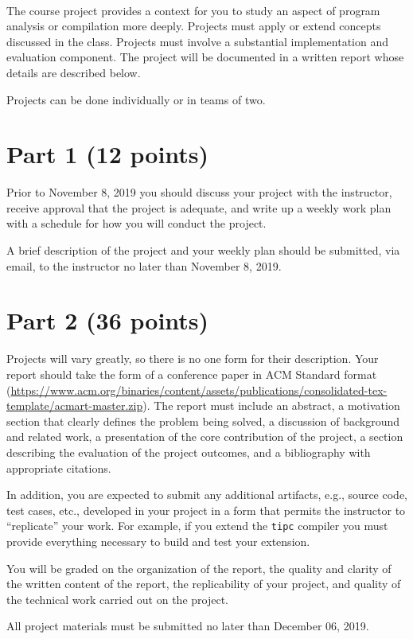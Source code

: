 \documentclass[12pt,letterpaper]{article}
\begin{document}
~

The course project provides a context for you to study
an aspect of program analysis or compilation more deeply.
Projects must apply or extend concepts discussed in the class.
Projects must involve a substantial implementation and evaluation
component.  The project will be documented in a written
report whose details are described below. 

Projects can be done individually or in teams of two.

\section*{Part 1 (12 points)}
Prior to November 8, 2019 you should discuss your
project with the instructor, receive approval that the
project is adequate, and write up a weekly work plan with
a schedule for how you will conduct the project.

A brief description of the project and your weekly plan should
be submitted, via email, to the instructor no later than
November 8, 2019.

\section*{Part 2 (36 points)}
Projects will vary greatly, so there is no one form for their
description.  Your report should take the form of a 
conference paper in ACM Standard format (\url{https://www.acm.org/binaries/content/assets/publications/consolidated-tex-template/acmart-master.zip}). The report must include an abstract, a motivation 
section that clearly defines the problem being solved,
a discussion of background and related work, a presentation
of the core contribution of the project, a section describing
the evaluation of the project outcomes, and a bibliography
with appropriate citations.

In addition, you are expected to submit any additional artifacts,
e.g., source code, test cases, etc., developed in your project
in a form that permits the instructor to ``replicate'' your work.
For example, if you extend the \texttt{tipc} compiler you must
provide everything necessary to build and test your extension.

You will be graded on the organization of the report,
the quality and clarity of the written content of the report,
the replicability of your project,
and quality of the technical work carried out on the project.

All project materials must be submitted no later than December 06, 2019.
\end{document}
